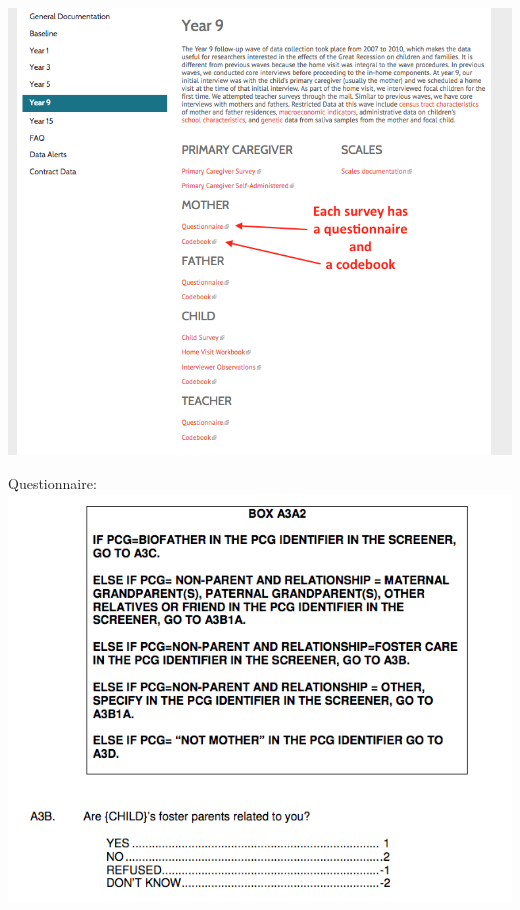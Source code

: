 \documentclass{beamer}
\begin{document}
\begin{frame}

\centering\includegraphics[width = .8\textwidth]{figures/Doc3}

\end{frame}
\begin{frame}

Questionnaire:\\
\centering\includegraphics[width = .8\textwidth]{figures/Doc4}

\end{frame}
\end{document}
